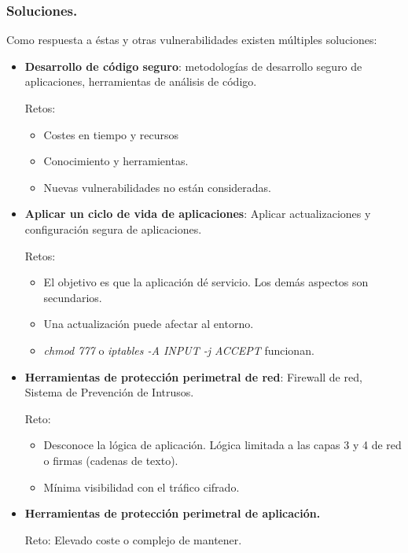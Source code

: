 \begin{frame}[allowframebreaks]
  \frametitle{Soluciones.}
  Como respuesta a éstas y otras vulnerabilidades existen múltiples soluciones:
  \begin{itemize}
    \item {\bf Desarrollo de código seguro}: metodologías de desarrollo seguro de aplicaciones, herramientas de análisis de código.
      \par Retos:
      \begin{itemize}
        \item Costes en tiempo y recursos
        \item Conocimiento y herramientas.
        \item Nuevas vulnerabilidades no están consideradas.
      \end{itemize}
    \item {\bf Aplicar un ciclo de vida de aplicaciones}: Aplicar actualizaciones y configuración segura de aplicaciones.
      \par Retos:
      \begin{itemize}
        \item El objetivo es que la aplicación dé servicio. Los demás aspectos son secundarios.
        \item Una actualización puede afectar al entorno.
        \item {\em chmod 777} o {\em iptables -A INPUT -j ACCEPT} funcionan.
      \end{itemize}
    \item {\bf Herramientas de protección perimetral de red}: Firewall de red, Sistema de Prevención de Intrusos.
      \par Reto:
      \begin{itemize}
        \item Desconoce la lógica de aplicación. Lógica limitada a las capas 3 y 4 de red o firmas (cadenas de texto).
        \item Mínima visibilidad con el tráfico cifrado.
      \end{itemize}
    \item {\bf Herramientas de protección perimetral de aplicación.}
      \par Reto: Elevado coste o complejo de mantener.
  \end{itemize}
\end{frame}


